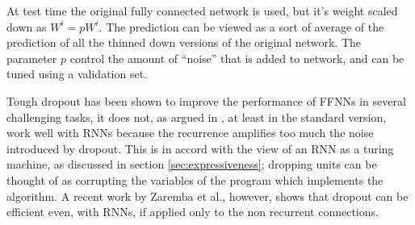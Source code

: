 At test time the original fully connected network is used, but it's weight scaled down as $W^{i} = pW^{i}$. The prediction can be viewed as a sort of average of the prediction of all the thinned down versions of the original network. The parameter $p$ control the amount of ``noise'' that is added to network, and can be tuned using a validation set.


Tough dropout has been shown \cite{dropout} to improve the performance of FFNNs in several challenging tasks, it does not, as argued in \cite{dropoutBayer}, at least in the standard version, work well with RNNs because the recurrence amplifies too much the noise introduced by dropout. This is in accord with the view of an RNN as a turing machine, as discussed in section \ref{sec:expressiveness}; dropping units can be thought of as corrupting the variables of the program which implements the algorithm.
A recent work by Zaremba et al., however, shows that dropout can be efficient even, with RNNs, if applied only to the non recurrent connections\cite{dropoutRNNs}.
